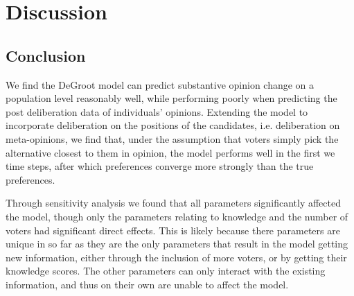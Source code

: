 \newpage
\chapter{Discussion}
\label{Discussion}


\section{Conclusion}

We find the DeGroot model can predict substantive opinion change on a
population level reasonably well, while performing poorly when predicting the
post deliberation data of individuals' opinions. Extending the model to
incorporate deliberation on the positions of the candidates, i.e. deliberation
on meta-opinions, we find that, under the assumption that voters simply pick
the alternative closest to them in opinion, the model performs well in the
first we time steps, after which preferences converge more strongly than the
true preferences.

Through sensitivity analysis we found that all parameters significantly
affected the model, though only the parameters relating to knowledge and the
number of voters had significant direct effects. This is likely because there
parameters are unique in so far as they are the only parameters that result in
the model getting new information, either through the inclusion of more voters,
or by getting their knowledge scores. The other parameters can only interact
with the existing information, and thus on their own are unable to affect the
model.







